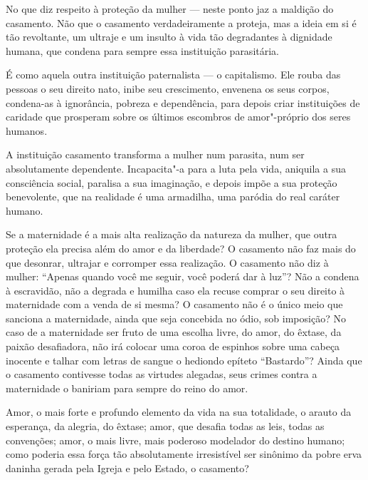 No que diz respeito à proteção da mulher --- neste ponto jaz a maldição
do casamento. Não que o casamento verdadeiramente a proteja, mas a ideia
em si é tão revoltante, um ultraje e um insulto à vida tão degradantes à
dignidade humana, que condena para sempre essa instituição parasitária.

É como aquela outra instituição paternalista --- o capitalismo. Ele rouba
das pessoas o seu direito nato, inibe seu crescimento, envenena os seus
corpos, condena-as à ignorância, pobreza e dependência, para depois
criar instituições de caridade que prosperam sobre os últimos escombros de
amor"-próprio dos seres humanos.

A instituição casamento transforma a mulher num parasita, num ser
absolutamente dependente. Incapacita"-a para a luta pela vida, aniquila a
sua consciência social, paralisa a sua imaginação, e depois impõe a sua
proteção benevolente, que na realidade é uma armadilha, uma paródia do
real caráter humano.\label{parasita}

Se a maternidade é a mais alta realização da natureza da mulher, que
outra proteção ela precisa além do amor e da liberdade? O casamento não
faz mais do que desonrar, ultrajar e corromper essa realização. O
casamento não diz à mulher: ``Apenas quando você me seguir, você poderá
dar à luz''? Não a condena à escravidão, não a degrada e humilha caso
ela recuse comprar o seu direito à maternidade com a venda de si mesma?
O casamento não é o único meio que sanciona a maternidade, ainda que
seja concebida no ódio, sob imposição? No caso de a maternidade ser
fruto de uma escolha livre, do amor, do êxtase, da paixão desafiadora,
não irá colocar uma coroa de espinhos sobre uma cabeça inocente e talhar
com letras de sangue o hediondo epíteto ``Bastardo''? Ainda que o
casamento contivesse todas as virtudes alegadas, seus crimes contra a
maternidade o baniriam para sempre do reino do amor.

Amor, o mais forte e profundo elemento da vida na sua totalidade, o arauto da
esperança, da alegria, do êxtase; amor, que desafia todas as leis, todas
as convenções; amor, o mais livre, mais poderoso modelador do destino
humano; como poderia essa força tão absolutamente irresistível ser sinônimo
da pobre erva daninha gerada pela Igreja e pelo Estado, o casamento?

